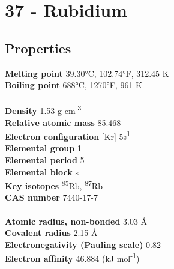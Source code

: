 \section{37 - Rubidium}
\label{sec:elem-rubidium}
\subsection{Properties}
\textbf{Melting point} 39.30°C, 102.74°F, 312.45 K\\
\textbf{Boiling point} 688°C, 1270°F, 961 K\\
\\
\textbf{Density} 1.53 g cm\textsuperscript{-3}\\
\textbf{Relative atomic mass} 85.468\\
\textbf{Electron configuration} [Kr] 5s\textsuperscript{1}\\
\textbf{Elemental group} 1\\
\textbf{Elemental period} 5\\
\textbf{Elemental block} s\\
\textbf{Key isotopes} \textsuperscript{85}Rb, \textsuperscript{87}Rb\\
\textbf{CAS number} 7440-17-7\\
\\
\textbf{Atomic radius, non-bonded} 3.03 Å\\
\textbf{Covalent radius} 2.15 Å\\
\textbf{Electronegativity (Pauling scale)} 0.82\\
\textbf{Electron affinity} 46.884 (kJ mol\textsuperscript{-1})\\